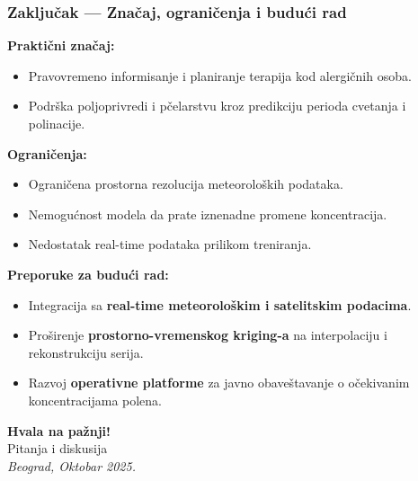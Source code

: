 \begin{frame}
    \frametitle{Zaključak — Značaj, ograničenja i budući rad}

    \textbf{Praktični značaj:}
    \begin{itemize}
        \item Pravovremeno informisanje i planiranje terapija kod alergičnih osoba.
        \item Podrška poljoprivredi i pčelarstvu kroz predikciju perioda cvetanja i polinacije.
    \end{itemize}

    \vspace{0.2cm}
    \textbf{Ograničenja:}
    \begin{itemize}
        \item Ograničena prostorna rezolucija meteoroloških podataka.
        \item Nemogućnost modela da prate iznenadne promene koncentracija.
        \item Nedostatak real-time podataka prilikom treniranja.
    \end{itemize}

    \vspace{0.2cm}
    \textbf{Preporuke za budući rad:}
    \begin{itemize}
        \item Integracija sa \textbf{real-time meteorološkim i satelitskim podacima}.
        \item Proširenje \textbf{prostorno-vremenskog kriging-a} na interpolaciju i rekonstrukciju serija.
        \item Razvoj \textbf{operativne platforme} za javno obaveštavanje o očekivanim koncentracijama polena.
    \end{itemize}

\end{frame}


\begin{frame}
    \centering
    \vfill
    {\Huge \textbf{Hvala na pažnji!}} \\[1em]
    {\large Pitanja i diskusija} \\[3em]
    {\small \textit{Beograd, Oktobar 2025.}}
    \vfill
\end{frame}

